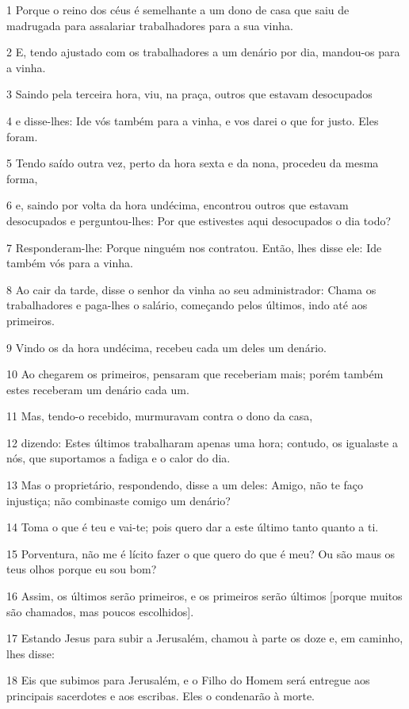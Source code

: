 \par 1 Porque o reino dos céus é semelhante a um dono de casa que saiu de madrugada para assalariar trabalhadores para a sua vinha.
\par 2 E, tendo ajustado com os trabalhadores a um denário por dia, mandou-os para a vinha.
\par 3 Saindo pela terceira hora, viu, na praça, outros que estavam desocupados
\par 4 e disse-lhes: Ide vós também para a vinha, e vos darei o que for justo. Eles foram.
\par 5 Tendo saído outra vez, perto da hora sexta e da nona, procedeu da mesma forma,
\par 6 e, saindo por volta da hora undécima, encontrou outros que estavam desocupados e perguntou-lhes: Por que estivestes aqui desocupados o dia todo?
\par 7 Responderam-lhe: Porque ninguém nos contratou. Então, lhes disse ele: Ide também vós para a vinha.
\par 8 Ao cair da tarde, disse o senhor da vinha ao seu administrador: Chama os trabalhadores e paga-lhes o salário, começando pelos últimos, indo até aos primeiros.
\par 9 Vindo os da hora undécima, recebeu cada um deles um denário.
\par 10 Ao chegarem os primeiros, pensaram que receberiam mais; porém também estes receberam um denário cada um.
\par 11 Mas, tendo-o recebido, murmuravam contra o dono da casa,
\par 12 dizendo: Estes últimos trabalharam apenas uma hora; contudo, os igualaste a nós, que suportamos a fadiga e o calor do dia.
\par 13 Mas o proprietário, respondendo, disse a um deles: Amigo, não te faço injustiça; não combinaste comigo um denário?
\par 14 Toma o que é teu e vai-te; pois quero dar a este último tanto quanto a ti.
\par 15 Porventura, não me é lícito fazer o que quero do que é meu? Ou são maus os teus olhos porque eu sou bom?
\par 16 Assim, os últimos serão primeiros, e os primeiros serão últimos [porque muitos são chamados, mas poucos escolhidos].
\par 17 Estando Jesus para subir a Jerusalém, chamou à parte os doze e, em caminho, lhes disse:
\par 18 Eis que subimos para Jerusalém, e o Filho do Homem será entregue aos principais sacerdotes e aos escribas. Eles o condenarão à morte.
